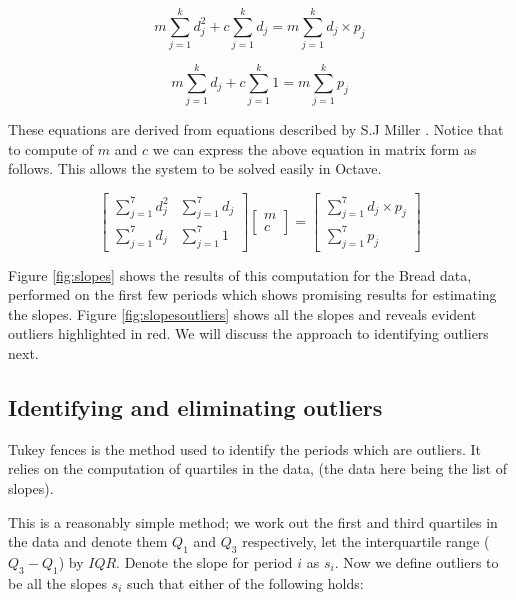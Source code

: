 $$
m\sum_{j = 1}^{k} d_{j}^2 + c\sum_{j = 1}^{k} d_{j} = m\sum_{j = 1}^{k} d_{j} \times p_{j}
$$

$$
m\sum_{j = 1}^{k} d_{j} + c\sum_{j = 1}^{k} 1 = m\sum_{j = 1}^{k}  p_{j}
$$

These equations are derived from equations described by S.J Miller \cite{squares}. Notice that to compute of $m$ and $c$ we can express the above equation in matrix form as follows. This allows the system to be solved easily in Octave.

\[
\begin{bmatrix}
\sum_{j = 1}^{7} d_{j}^2 & \sum_{j = 1}^{7} d_{j} \\
\sum_{j = 1}^{7} d_{j} & \sum_{j = 1}^{7} 1
\end{bmatrix}
\begin{bmatrix}
m\\
c
\end{bmatrix}
=
\begin{bmatrix}
\sum_{j = 1}^{7} d_{j} \times p_{j}\\
\sum_{j = 1}^{7}  p_{j}
\end{bmatrix}
\]

Figure \ref{fig:slopes} shows the results of this computation for the Bread data, performed on the first few periods which shows promising results for estimating the slopes. Figure \ref{fig:slopesoutliers} shows all the slopes and reveals evident outliers highlighted in red. We will discuss the approach to identifying outliers next.



\subsection{Identifying and eliminating outliers}

Tukey fences \cite{tukey} is the method used to identify the periods which are outliers.  It relies on the computation of quartiles in the data, (the data here being the list of slopes).

This is a reasonably simple method; we work out the first and third quartiles in the data and denote them $Q_1$ and $Q_3$ respectively, let the interquartile range ($Q_3 - Q_1$) by $IQR$. Denote the slope for period $i$ as $s_i$. Now we define outliers to be all the slopes $s_i$ such that either of the following holds:

